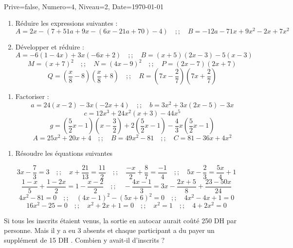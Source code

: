 \documentclass[a4paper,12pt]{article}
\begin{document}
\begin{Maquette}[DM]{Prive=false, Numero=4, Niveau=2, Date=\today}

\begin{exercice}
\begin{enumerate}
\item Réduire les expressions suivantes :
\[
A=2x-\left(7+51a+9x-\left(6x-21a+70\right)-4\right)\quad ;; \quad
B=-12a-71x+9x^{2}-2x+7x^{2}
\]
\item Développer et réduire :
\[
A=-6\left(1-4x\right)+3x\left(-6x+2\right)\quad ;; \quad
B=\left(x+5\right)\left(2x-3\right)-5\left(x-3\right)
\]
\[
M=\left(x+7\right)^{2}\quad ;; \quad
N=\left(4x-9\right)^{2}\quad ;; \quad
P=\left(2x-7\right)\left(2x+7\right)
\]
\[
Q=\left(\dfrac{x}{8}-8\right)\left(\dfrac{x}{8}+8\right)\quad ;; \quad
R=\left(7x-\dfrac{2}{7}\right)\left(7x+\dfrac{2}{7}\right)
\]
\end{enumerate}
\end{exercice}

\begin{exercice}
\begin{enumerate}
\item Factoriser :
\[
a=24\left(x-2\right)-3x\left(-2x+4\right)\quad ;; \quad
b=3x^{2}+3x\left(2x-5\right)-3x
\]
\[
c=12x^{3}+24x^{2}\left(x+3\right)-44x^{5}
\]
\[
g=\left(\dfrac{5}{2}x-1\right)\left(x-\dfrac{3}{2}\right)+2\left(\dfrac{5}{2}x-1\right)-\dfrac{4}{3}x\left(\dfrac{5}{2}x-1\right)
\]
\[
A=25x^{2}+20x+4\quad ;; \quad
B=49x^{2}-81\quad ;; \quad
C=81-36x+4x^{2}
\]
\end{enumerate}
\end{exercice}

\begin{exercice}
\begin{enumerate}
\item Résoudre les équations suivantes 
\end{enumerate}
\[
3x-\dfrac{7}{3}=3\quad ;; \quad
x+\dfrac{21}{13}=\dfrac{11}{2}\quad ;; \quad
\dfrac{-x}{2}+\dfrac{8}{7}=\dfrac{-1}{4}\quad ;; \quad
5x-\dfrac{2}{3}=\dfrac{5x}{4}+1
\]
\[
\dfrac{1-x}{5}+\dfrac{1-2x}{2}=1-\dfrac{x-2}{2}\quad ;; \quad
-\dfrac{4x-1}{3}=3x-\dfrac{2x+5}{8}+\dfrac{23-50x}{24}
\]
\[
4x^{2}-81=0 \quad ;; \quad
\left(4x-1\right)^{2}-(5x+6)^{2}=0\quad ;; \quad
4x^{2}-4x+1=0
\]
\[
16x^{2}-25=0\quad ;; \quad
x^{2}+2x+1=0\quad ;; \quad
x^{2}=1\quad ;; \quad
4+2x^{2}=0
\]
\end{exercice}

\begin{exercice}
Si tous les inscrits étaient venus, la sortie en autocar aurait coûté 250 DH par personne. Mais il y a eu 3 absents et chaque participant a du payer un supplément de 15 DH . Combien y avait-il d'inscrits ?
\end{exercice}
\end{Maquette}
\end{document}
